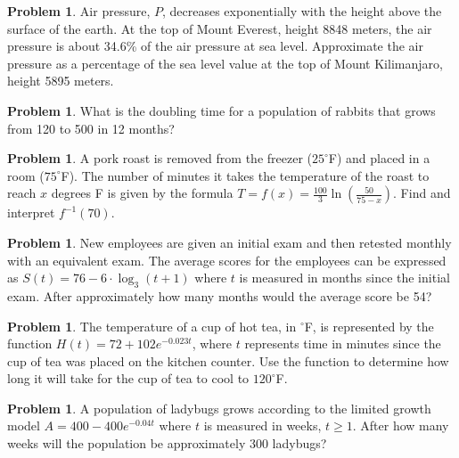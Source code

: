 \documentclass[12pt]{scrartcl}
\theoremstyle{definition}
\newtheorem{problem}[theorem]{Problem}
\begin{document}
\newpage

\begin{problem}
	Air pressure, $P$, decreases exponentially with the height above the surface of the earth. At the top of Mount Everest, height 8848 meters, the air pressure is about 34.6\% of the air pressure at sea level. Approximate the air pressure as a percentage of the sea level value at the top of Mount Kilimanjaro, height 5895 meters.
\end{problem}

\newpage

\begin{problem}
	What is the doubling time for a population of rabbits that grows from 120 to 500 in 12 months?
\end{problem}

\newpage

\begin{problem}
	A pork roast is removed from the freezer ($25^\circ$F) and placed in a room ($75^\circ$F). The number of minutes it takes the temperature of the roast to reach $x$ degrees F is given by the formula $T=f(x)=\frac{100}{3}\ln\left(\frac{50}{75-x}\right)$. Find and interpret $f^{-1}(70)$.
\end{problem}

\newpage

\begin{problem}
	New employees are given an initial exam and then retested monthly with an equivalent exam. The average scores for the employees can be expressed as $S(t)=76-6\cdot \log_{3}(t+1)$ where $t$ is measured in months since the initial exam. After approximately how many months would the average score be 54?
\end{problem}

\newpage

\begin{problem}
	The temperature of a cup of hot tea, in $^\circ$F, is represented by the function $H(t)=72+102e^{-0.023t}$, where $t$ represents time in minutes since the cup of tea was placed on the kitchen counter. Use the function to determine how long it will take for the cup of tea to cool to $120^\circ$F. 
\end{problem}

\newpage

\begin{problem}
	A population of ladybugs grows according to the limited growth model $A=400-400e^{-0.04t}$ where $t$ is measured in weeks, $t \geq 1$. After how many weeks will the population be approximately 300 ladybugs?
\end{problem}
\end{document}
